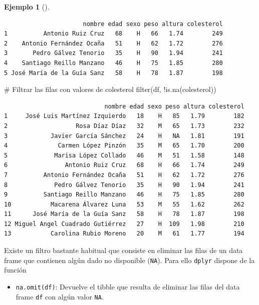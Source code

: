 \documentclass[
  a4paper,
]{scrreport}
\newenvironment{Shaded}{\begin{snugshade}}{\end{snugshade}}
\newcommand{\CommentTok}[1]{\textcolor[rgb]{0.37,0.37,0.37}{#1}}
\newcommand{\FunctionTok}[1]{\textcolor[rgb]{0.28,0.35,0.67}{#1}}
\newcommand{\NormalTok}[1]{\textcolor[rgb]{0.00,0.23,0.31}{#1}}
\newcommand{\SpecialCharTok}[1]{\textcolor[rgb]{0.37,0.37,0.37}{#1}}
\providecommand{\tightlist}{%
  \setlength{\itemsep}{0pt}\setlength{\parskip}{0pt}}\usepackage{longtable,booktabs,array}
\theoremstyle{definition}
\theoremstyle{definition}
\newtheorem{example}{Ejemplo}[chapter]
\theoremstyle{remark}
\begin{document}
\begin{example}[]
\begin{verbatim}
                      nombre edad sexo peso altura colesterol
1          Antonio Ruiz Cruz   68    H   66   1.74        249
2    Antonio Fernández Ocaña   51    H   62   1.72        276
3       Pedro Gálvez Tenorio   35    H   90   1.94        241
4    Santiago Reillo Manzano   46    H   75   1.85        280
5 José María de la Guía Sanz   58    H   78   1.87        198
\end{verbatim}

\begin{Shaded}
\begin{Highlighting}[]
\CommentTok{\# Filtrar las filas con valores de colesterol}
\FunctionTok{filter}\NormalTok{(df, }\SpecialCharTok{!}\FunctionTok{is.na}\NormalTok{(colesterol))}
\end{Highlighting}
\end{Shaded}

\begin{verbatim}
                            nombre edad sexo peso altura colesterol
1     José Luis Martínez Izquierdo   18    H   85   1.79        182
2                   Rosa Díaz Díaz   32    M   65   1.73        232
3            Javier García Sánchez   24    H   NA   1.81        191
4              Carmen López Pinzón   35    M   65   1.70        200
5             Marisa López Collado   46    M   51   1.58        148
6                Antonio Ruiz Cruz   68    H   66   1.74        249
7          Antonio Fernández Ocaña   51    H   62   1.72        276
8             Pedro Gálvez Tenorio   35    H   90   1.94        241
9          Santiago Reillo Manzano   46    H   75   1.85        280
10           Macarena Álvarez Luna   53    M   55   1.62        262
11      José María de la Guía Sanz   58    H   78   1.87        198
12 Miguel Angel Cuadrado Gutiérrez   27    H  109   1.98        210
13           Carolina Rubio Moreno   20    M   61   1.77        194
\end{verbatim}

\end{example}

Existe un filtro bastante habitual que consiste en eliminar las filas de
un data frame que contienen algún dado no disponible (\texttt{NA}). Para
ello \texttt{dplyr} dispone de la función

\begin{itemize}
\tightlist
\item
  \texttt{na.omit(df)}: Devuelve el tibble que resulta de eliminar las
  filas del data frame \texttt{df} con algún valor \texttt{NA}.
\end{itemize}
\end{document}
